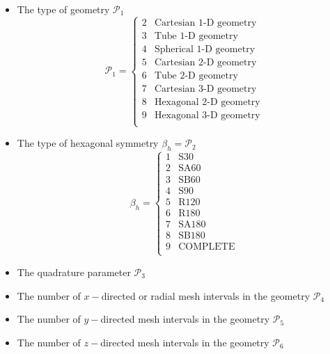 \begin{itemize}
\item The type of geometry $\mathcal{P}_{1}$
\begin{displaymath}
\mathcal{P}_{1} = \left\{
\begin{array}{rl}
 2 & \textrm{Cartesian 1-D geometry} \\ 
 3 & \textrm{Tube 1-D geometry}  \\
 4 & \textrm{Spherical 1-D geometry}  \\
 5 & \textrm{Cartesian 2-D geometry}  \\
 6 & \textrm{Tube 2-D geometry}  \\
 7 & \textrm{Cartesian 3-D geometry}  \\
 8 & \textrm{Hexagonal 2-D geometry}   \\
 9 & \textrm{Hexagonal 3-D geometry}  \\
\end{array} \right.
\end{displaymath}

\item The type of hexagonal symmetry $\beta_{h}=\mathcal{P}_{2}$
\begin{displaymath}
\beta_{h} = \left\{
\begin{array}{rl}
 1 & \textrm{S30} \\
 2 & \textrm{SA60} \\
 3 & \textrm{SB60} \\
 4 & \textrm{S90} \\
 5 & \textrm{R120} \\
 6 & \textrm{R180} \\
 7 & \textrm{SA180} \\
 8 & \textrm{SB180} \\
 9 & \textrm{COMPLETE} \\
\end{array} \right.
\end{displaymath}

\item The quadrature parameter $\mathcal{P}_{3}$

\item The number of $x-$directed or radial mesh intervals in the geometry $\mathcal{P}_{4}$

\item The number of $y-$directed mesh intervals in the geometry $\mathcal{P}_{5}$

\item The number of $z-$directed mesh intervals in the geometry $\mathcal{P}_{6}$

\end{itemize}

